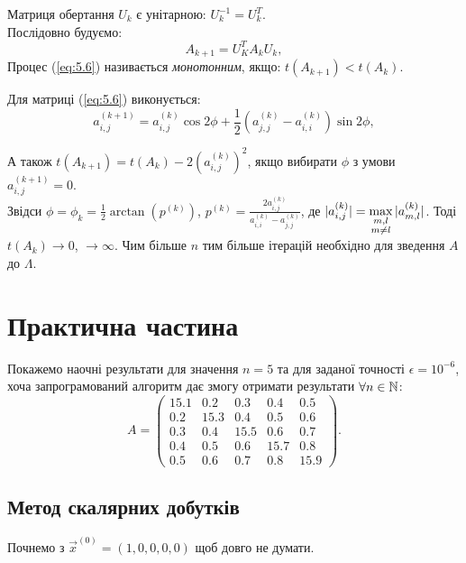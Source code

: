 Матриця обертання $U_k$ є унітарною: $U_k^{-1} = U_k^T$. \\

Послідовно будуємо:
\begin{equation}
	\label{eq:5.6}
	A_{k+1} = U_K^T A_k U_k,
\end{equation}
Процес (\ref{eq:5.6}) називається \textit{монотонним}, якщо: $t(A_{k+1})<t(A_k)$.

Для матриці (\ref{eq:5.6}) виконується:
\begin{equation}
	\label{eq:5.7}
	a_{i,j}^{(k+1)} = a_{i,j}^{(k)} \cos 2 \phi + \dfrac12 (a_{j,j}^{(k)} - a_{i,i}^{(k)}) \sin 2 \phi,
\end{equation}

А також $t(A_{k+1})=t(A_k)-2(a_{i,j}^{(k)})^2$, якщо вибирати $\phi$ з умови $a_{i,j}^{(k+1)} = 0$. \\

Звідси $\phi = \phi_k = \frac12 \arctan(p^{(k)})$, $p^{(k)} = \frac{2a_{i,j}^{(k)}}{a_{i,i}^{(k)}-a_{j,j}^{(k)}}$, де $|a_{i,j}^{(k)}| = \displaystyle\max\limits_{\substack{m,l \\ m \ne l}} |a_{m,l}^{(k)}|$. Тоді
$t(A_k) \to 0$, $\to \infty$. Чим більше $n$ тим більше ітерацій необхідно для зведення $A$ до $\Lambda$. 

\section{Практична частина}

Покажемо наочні результати для значення $n = 5$ та для заданої точності $\epsilon = 10^{-6}$, хоча запрограмований алгоритм дає змогу отримати результати $\forall n \in \mathbb{N}$:
\[ A = \begin{pmatrix} 15.1 & 0.2 & 0.3 & 0.4 & 0.5 \\ 0.2 & 15.3 & 0.4 & 0.5 & 0.6 \\ 0.3 & 0.4 & 15.5 & 0.6 & 0.7 \\ 0.4 & 0.5 & 0.6 & 15.7 & 0.8 \\ 0.5 & 0.6 & 0.7 & 0.8 & 15.9 \end{pmatrix}. \]

\subsection{Метод скалярних добутків}

Почнемо з $\vec x^{(0)} = (1, 0, 0, 0, 0)$ щоб довго не думати.

